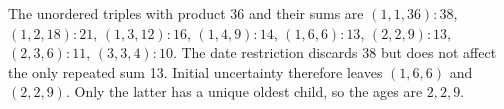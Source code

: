 The unordered triples with product 36 and their sums are $(1,1,36):38$, $(1,2,18):21$, $(1,3,12):16$, $(1,4,9):14$, $(1,6,6):13$, $(2,2,9):13$, $(2,3,6):11$, $(3,3,4):10$. The date restriction discards 38 but does not affect the only repeated sum 13. Initial uncertainty therefore leaves $(1,6,6)$ and $(2,2,9)$. Only the latter has a unique oldest child, so the ages are $\boxed{2,2,9}$.
